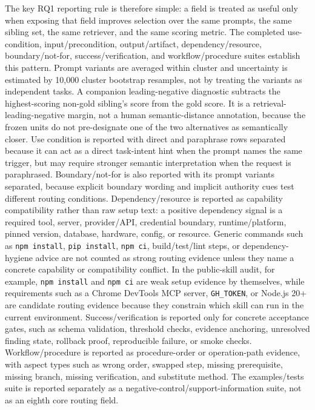 The key RQ1 reporting rule is therefore simple: a field is treated as useful only when exposing that field improves selection over the same prompts, the same sibling set, the same retriever, and the same scoring metric. The completed use-condition, input/precondition, output/artifact, dependency/resource, boundary/not-for, success/verification, and workflow/procedure suites establish this pattern. Prompt variants are averaged within cluster and uncertainty is estimated by 10,000 cluster bootstrap resamples, not by treating the variants as independent tasks. A companion leading-negative diagnostic subtracts the highest-scoring non-gold sibling's score from the gold score. It is a retrieval-leading-negative margin, not a human semantic-distance annotation, because the frozen units do not pre-designate one of the two alternatives as semantically closer. Use condition is reported with direct and paraphrase rows separated because it can act as a direct task-intent hint when the prompt names the same trigger, but may require stronger semantic interpretation when the request is paraphrased. Boundary/not-for is also reported with its prompt variants separated, because explicit boundary wording and implicit authority cues test different routing conditions. Dependency/resource is reported as capability compatibility rather than raw setup text: a positive dependency signal is a required tool, server, provider/API, credential boundary, runtime/platform, pinned version, database, hardware, config, or resource. Generic commands such as \texttt{npm install}, \texttt{pip install}, \texttt{npm ci}, build/test/lint steps, or dependency-hygiene advice are not counted as strong routing evidence unless they name a concrete capability or compatibility conflict. In the public-skill audit, for example, \texttt{npm install} and \texttt{npm ci} are weak setup evidence by themselves, while requirements such as a Chrome DevTools MCP server, \texttt{GH\_TOKEN}, or Node.js 20+ are candidate routing evidence because they constrain which skill can run in the current environment. Success/verification is reported only for concrete acceptance gates, such as schema validation, threshold checks, evidence anchoring, unresolved finding state, rollback proof, reproducible failure, or smoke checks. Workflow/procedure is reported as procedure-order or operation-path evidence, with aspect types such as wrong order, swapped step, missing prerequisite, missing branch, missing verification, and substitute method. The examples/tests suite is reported separately as a negative-control/support-information suite, not as an eighth core routing field.

